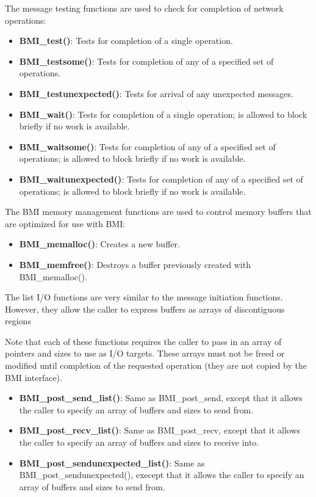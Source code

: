 \documentclass[11pt]{article}
\begin{document}
The message testing functions are used to check for completion of
network operations:

\begin{itemize}

\item \textbf{BMI\_test()}: Tests for completion of a single
operation.
\item \textbf{BMI\_testsome()}: Tests for completion of any of a
specified set of operations.
\item \textbf{BMI\_testunexpected()}: Tests for arrival of any
unexpected messages.
\item \textbf{BMI\_wait()}:  Tests for completion of a single
operation; is allowed to block briefly if no work is available.
\item \textbf{BMI\_waitsome()}: Tests for completion of any of a
specified set of operations; is allowed to block briefly if no
work is available.
\item \textbf{BMI\_waitunexpected()}: Tests for completion of any
of a specified set of operations; is allowed to block briefly if
no work is available.
\end{itemize}

The BMI memory management functions are used to control memory buffers
that are optimized for use with BMI:

\begin{itemize}

\item \textbf{BMI\_memalloc()}:  Creates a new buffer. 
\item \textbf{BMI\_memfree()}:  Destroys a buffer previously
created with BMI\_memalloc().

\end{itemize}

The list I/O functions are very similar to the message initiation
functions.  However, they allow the caller to express buffers as
arrays of discontiguous regions

Note that each of these functions requires the caller to pass in
an array of pointers and sizes to use as I/O targets.  These
arrays must not be freed or modified until completion of the
requested operation (they are not copied by the BMI interface).

\begin{itemize}
\item \textbf{BMI\_post\_send\_list()}:  Same as BMI\_post\_send,
except that it allows the caller to specify an array of buffers
and sizes to send from.
\item \textbf{BMI\_post\_recv\_list()}:  Same as BMI\_post\_recv,
except that it allows the caller to specify an array of buffers
and sizes to receive into.
\item \textbf{BMI\_post\_sendunexpected\_list()}:  Same as
BMI\_post\_sendunexpected(), execept that it allows the caller to
specify an array of buffers and sizes to send from.
\end{itemize}
\end{document}
